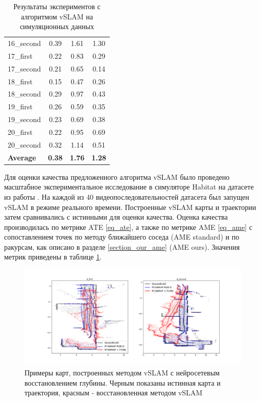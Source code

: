 \documentclass{mipt-thesis-ms}
\begin{document}
\begin{table}
\begin{tabular}{l|c|c|c}
			16\_second & 0.39 & 1.61 & 1.30 \\
			17\_first & 0.22 & 0.83 & 0.29 \\
			17\_second & 0.21 & 0.65 & 0.14 \\
			18\_first & 0.15 & 0.47 & 0.26 \\
			18\_second & 0.29 & 0.97 & 0.43 \\
			19\_first & 0.26 & 0.59 & 0.35 \\
			19\_second & 0.23 & 0.69 & 0.38 \\
			20\_first & 0.22 & 0.95 & 0.69 \\
			20\_second & 0.32 & 1.14 & 0.51 \\
			\hline
			\textbf{Average}                       &   \textbf{0.38}                          & \textbf{1.76}                          & \textbf{1.28}\\                         
		\end{tabular}
		\caption{Результаты экспериментов с алгоритмом vSLAM на симуляционных данных}
		\label{table_maomaps_results}
	\end{table}
	
	Для оценки качества предложенного алгоритма vSLAM было проведено масштабное экспериментальное исследование в симуляторе Habitat \cite{savva2019habitat} на датасете из работы \cite{bokovoy2021maomaps}. На каждой из 40 видеопоследовательностей датасета был запущен vSLAM в режиме реального времени. Построенные vSLAM карты и траектории затем сравнивались с истинными для оценки качества. Оценка качества производилась по метрике ATE \ref{eq_ate}, а также по метрике AME \ref{eq_ame} с сопоставлением точек по методу ближайшего соседа (AME standard) и по ракурсам, как описано в разделе \ref{section_our_ame} (AME ours). Значения метрик приведены в таблице \ref{table_maomaps_results}.
	
	\begin{figure}
		\includegraphics[width=1.0\textwidth]{img/fcnn_maps_sample6.png}
		\caption{Примеры карт, построенных методом vSLAM с нейросетевым восстановлением глубины. Черным показаны истинная карта и траектория, красным - восстановленная методом vSLAM}
		\label{figure_slam_map_example}
	\end{figure}
	
\end{document}
